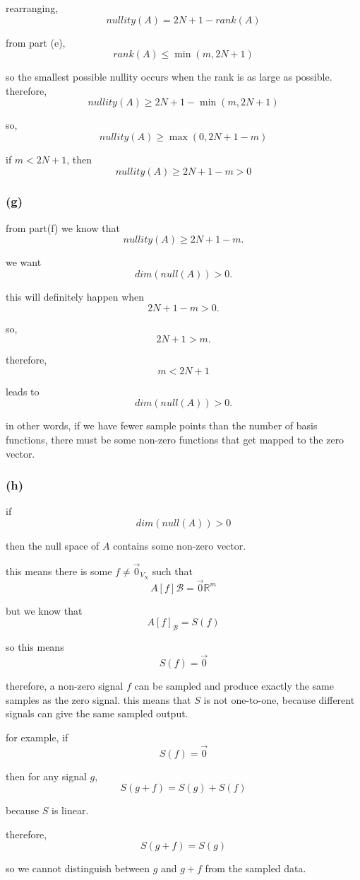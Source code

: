 \documentclass{article}
\begin{document}
rearranging,
\[
nullity(A)=2N+1-rank(A)
\]

from part (e),
\[
rank(A)\leq\min(m,2N+1)
\]

so the smallest possible nullity occurs when the rank is as large as possible.
therefore,
\[
nullity(A)\geq 2N+1-\min(m,2N+1)
\]

so,
\[
\boxed{nullity(A)\geq\max(0,2N+1-m)}
\]

if $m<2N+1$, then
\[
\boxed{nullity(A)\geq2N+1-m>0}
\]

\subsubsection*{(g)}
from part(f) we know that
\[
nullity(A)\geq2N+1-m.
\]

we want
\[
dim(null(A))>0.
\]

this will definitely happen when
\[
2N+1-m>0.
\]

so,
\[
2N+1>m.
\]

therefore,
\[
\boxed{m<2N+1}
\]

leads to
\[
\boxed{dim(null(A))>0}.
\]

in other words, if we have fewer sample points than the number of basis functions, there must be some non-zero functions that get mapped to the zero vector.

\subsubsection*{(h)}
if
\[
dim(null(A))>0
\]

then the null space of $A$ contains some non-zero vector.

this means there is some $f\neq\vec{0}_{V_N}$ such that
\[
A[f]{\mathcal B}=\vec{0}{\mathbb R^m}
\]

but we know that
\[
A[f]_{\mathcal B}=S(f)
\]

so this means
\[
S(f)=\vec{0}
\]

therefore, a non-zero signal $f$ can be sampled and produce exactly the same samples as the zero signal.
this means that $S$ is not one-to-one, because different signals can give the same sampled output.

for example, if
\[
S(f)=\vec{0}
\]

then for any signal $g$,
\[
S(g+f)=S(g)+S(f)
\]

because $S$ is linear.

therefore,
\[
S(g+f)=S(g)
\]

so we cannot distinguish between $g$ and $g+f$ from the sampled data.
\end{document}
